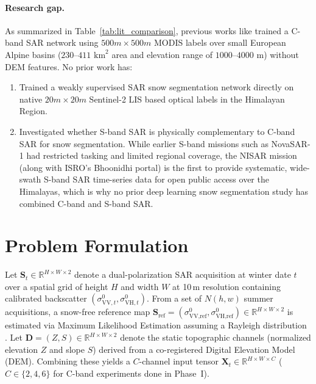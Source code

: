 \documentclass{article}
\newif\ifshowguide
\newcommand{\guide}[1]{%
  \ifshowguide
    \par\medskip\noindent
    \fcolorbox{blue!50}{blue!4}{%
      \begin{minipage}{\dimexpr\linewidth-2\fboxsep-2\fboxrule\relax}
        \small\color{blue!55!black}\textbf{Guidance.} #1
      \end{minipage}}%
    \par\medskip
  \fi}
\begin{document}
\paragraph{Research gap.}
As summarized in Table~\ref{tab:lit_comparison}, previous works like \citet{briand2026weakly} trained a C-band SAR network using $500m \times 500m$ MODIS labels over small European Alpine basins ($230\text{--}411\text{ km}^2$ area and elevation range of $1000\text{--}4000\text{ m}$) without DEM features. No prior work has:
\begin{enumerate}
    \item Trained a weakly supervised SAR snow segmentation network directly on native $20m \times 20m$ Sentinel-2 LIS based optical labels in the Himalayan Region.
    \item Investigated whether S-band SAR is physically complementary to C-band SAR for snow segmentation. While earlier S-band missions such as NovaSAR-1 had restricted tasking and limited regional coverage, the NISAR mission (along with ISRO's Bhoonidhi portal) is the first to provide systematic, wide-swath S-band SAR time-series data for open public access over the Himalayas, which is why no prior deep learning snow segmentation study has combined C-band and S-band SAR.
\end{enumerate}

\section{Problem Formulation}
\label{sec:formulation}

\guide{About half a page. Define the task formally: inputs, outputs, notation,
assumptions, and the evaluation metric(s) with their definitions. Explain why
each metric suits the problem (e.g., why macro-F1 rather than accuracy for
imbalanced classes). If your project is not a prediction task (e.g., a system,
an analysis or a dataset), state the research questions or hypotheses and how
each will be tested.}

Let $\mathbf{S}_t \in \mathbb{R}^{H \times W \times 2}$ denote a dual-polarization SAR acquisition at winter date $t$ over a spatial grid of height $H$ and width $W$ at 10\,m resolution containing calibrated backscatter $(\sigma^0_{\text{VV},t}, \sigma^0_{\text{VH},t})$. From a set of $N(h,w)$ summer acquisitions, a snow-free reference map $\mathbf{S}_{\text{ref}} = (\sigma^0_{\text{VV,ref}}, \sigma^0_{\text{VH,ref}}) \in \mathbb{R}^{H \times W \times 2}$ is estimated via Maximum Likelihood Estimation assuming a Rayleigh distribution \citep{briand2026weakly}. Let $\mathbf{D} = (Z, S) \in \mathbb{R}^{H \times W \times 2}$ denote the static topographic channels (normalized elevation $Z$ and slope $S$) derived from a co-registered Digital Elevation Model (DEM). Combining these yields a $C$-channel input tensor $\mathbf{X}_t \in \mathbb{R}^{H \times W \times C}$ ($C \in \{2, 4, 6\}$ for C-band experiments done in Phase~I).
\end{document}
